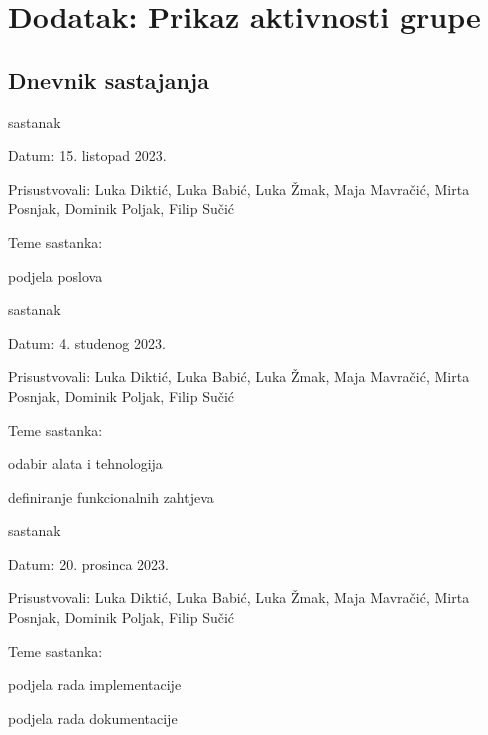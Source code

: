 \chapter*{Dodatak: Prikaz aktivnosti grupe}
		
		\section*{Dnevnik sastajanja}
		
		
		
		\begin{packed_enum}
			\item  sastanak
			
			\item[] \begin{packed_item}
				\item Datum: 15. listopad 2023.
				\item Prisustvovali: Luka Diktić, Luka Babić, Luka Žmak, Maja Mavračić, Mirta Posnjak, Dominik Poljak, Filip Sučić
				\item Teme sastanka:
				\begin{packed_item}
					\item  podjela poslova 
				
				\end{packed_item}
			\end{packed_item}
			
			\item  sastanak
			\item[] \begin{packed_item}
				\item Datum: 4. studenog 2023.
				\item Prisustvovali: Luka Diktić, Luka Babić, Luka Žmak, Maja Mavračić, Mirta Posnjak, Dominik Poljak, Filip Sučić
				\item Teme sastanka:
				\begin{packed_item}
					\item  odabir alata i tehnologija
					\item  definiranje funkcionalnih zahtjeva
				\end{packed_item}
			\end{packed_item}
			
			\item  sastanak
			\item[] \begin{packed_item}
				\item Datum: 20. prosinca 2023.
				\item Prisustvovali: Luka Diktić, Luka Babić, Luka Žmak, Maja Mavračić, Mirta Posnjak, Dominik Poljak, Filip Sučić
				\item Teme sastanka:
				\begin{packed_item}
					\item  podjela rada implementacije
					\item  podjela rada dokumentacije
				\end{packed_item}
			\end{packed_item}
			

\end{packed_enum}
